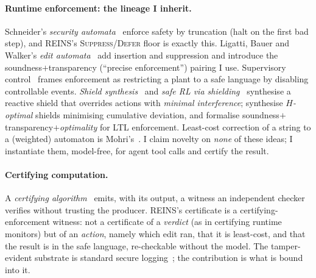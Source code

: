 \documentclass[11pt]{article}
\begin{document}
\paragraph{Runtime enforcement: the lineage I inherit.} Schneider's
\emph{security automata}~\citep{schneier1998securelogs,schneider2000enforceable}
enforce safety by truncation (halt on the first bad step), and REINS's
\textsc{Suppress}/\textsc{Defer} floor is exactly this. Ligatti, Bauer and
Walker's \emph{edit automata}~\citep{ligatti2005edit} add insertion and
suppression and introduce the soundness$+$transparency (``precise enforcement'')
pairing I use. Supervisory control~\citep{ramadge1987supervisory} frames
enforcement as restricting a plant to a safe language by disabling controllable
events. \emph{Shield synthesis}~\citep{bloem2015shield} and \emph{safe RL via
shielding}~\citep{alshiekh2018safe,konighofer2025shieldsrl} synthesise a reactive
shield that overrides actions with \emph{minimal interference};
\citet{pandya2019optimal} synthesise \emph{$H$-optimal} shields minimising
cumulative deviation, and \citet{gallay2021decentralized} formalise
soundness$+$transparency$+$\emph{optimality} for LTL enforcement. Least-cost
correction of a string to a (weighted) automaton is
Mohri's~\citep{mohri2003editdistance}. I claim novelty on \emph{none} of these
ideas; I instantiate them, model-free, for agent tool calls and certify the
result.

\paragraph{Certifying computation.} A \emph{certifying
algorithm}~\citep{mcconnell2011certifying} emits, with its output, a witness an
independent checker verifies without trusting the producer. REINS's certificate
is a certifying-enforcement witness: not a certificate of a \emph{verdict} (as in
certifying runtime monitors) but of an \emph{action}, namely which edit ran, that it is
least-cost, and that the result is in the safe language, re-checkable without
the model. The tamper-evident substrate is standard secure
logging~\citep{schneier1998securelogs,crosby2009historytree,laurie2013ct,
krawczyk1997hmac}; the contribution is what is bound into it.
\end{document}
